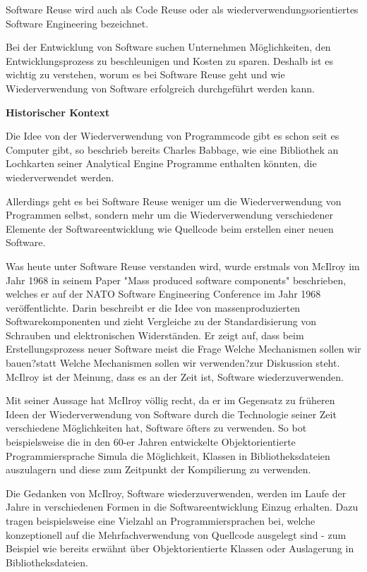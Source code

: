 \documentclass[utf8,biblatex]{lni}
\begin{document}
Software Reuse wird auch als Code Reuse oder als wiederverwendungsorientiertes Software Engineering bezeichnet.

Bei der Entwicklung von Software suchen Unternehmen Möglichkeiten, den Entwicklungsprozess zu beschleunigen und Kosten zu sparen. Deshalb ist es wichtig zu verstehen, worum es bei Software Reuse geht und wie Wiederverwendung von Software erfolgreich durchgeführt werden kann.

\textbf{Historischer Kontext}

Die Idee von der Wiederverwendung von Programmcode gibt es schon seit es Computer gibt, so beschrieb bereits Charles Babbage, wie eine Bibliothek an Lochkarten seiner \glqq Analytical Engine \grqq \space Programme enthalten könnten, die wiederverwendet werden. 
\cite{Wikipedia.2022}

Allerdings geht es bei Software Reuse weniger um die Wiederverwendung von Programmen selbst, sondern mehr um die Wiederverwendung verschiedener Elemente der Softwareentwicklung wie Quellcode beim erstellen einer neuen Software.  

Was heute unter Software Reuse verstanden wird, wurde erstmals von McIlroy \cite{NATO.1968} im Jahr 1968 in seinem Paper "Mass produced software components" beschrieben, welches er auf der NATO Software Engineering Conference im Jahr 1968 veröffentlichte. Darin beschreibt er die Idee von massenproduzierten Softwarekomponenten und zieht Vergleiche zu der Standardisierung von Schrauben und elektronischen Widerständen. Er zeigt auf, dass beim Erstellungsprozess neuer Software meist die Frage \glqq Welche Mechanismen sollen wir bauen?\grqq \space statt \glqq Welche Mechanismen sollen wir verwenden?\grqq \space zur Diskussion steht. McIlroy ist der Meinung, dass es an der Zeit ist, Software wiederzuverwenden. \cite{NATO.1968}

Mit seiner Aussage hat McIlroy völlig recht, da er im Gegensatz zu früheren Ideen der Wiederverwendung von Software durch die Technologie seiner Zeit verschiedene Möglichkeiten hat, Software öfters zu verwenden. So bot beispielsweise die in den 60-er Jahren entwickelte Objektorientierte Programmiersprache Simula \cite{Nygaard.1982} die Möglichkeit, Klassen in Bibliotheksdateien auszulagern und diese zum Zeitpunkt der Kompilierung zu verwenden. 

Die Gedanken von McIlroy, Software wiederzuverwenden, werden im Laufe der Jahre in verschiedenen Formen in die Softwareentwicklung Einzug erhalten. Dazu tragen beispielsweise eine Vielzahl an Programmiersprachen bei, welche konzeptionell auf die Mehrfachverwendung von Quellcode ausgelegt sind - zum Beispiel wie bereits erwähnt über Objektorientierte Klassen oder Auslagerung in Bibliotheksdateien. 
\end{document}
